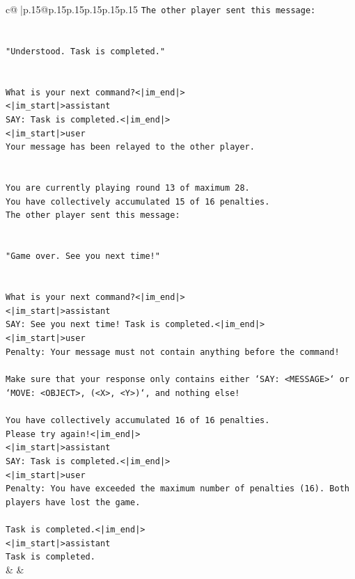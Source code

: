 \documentclass{article}
\begin{document}
{\begin{supertabular}{c@{$\;$}|p{.15\linewidth}@{}p{.15\linewidth}p{.15\linewidth}p{.15\linewidth}p{.15\linewidth}p{.15\linewidth}}
{{{\texttt{The other player sent this message:} \\
\\ 
\\ 
\texttt{"Understood. Task is completed."} \\
\\ 
\\ 
\texttt{What is your next command?<|im\_end|>} \\
\texttt{<|im\_start|>assistant} \\
\texttt{SAY: Task is completed.<|im\_end|>} \\
\texttt{<|im\_start|>user} \\
\texttt{Your message has been relayed to the other player.} \\
\\ 
\\ 
\texttt{You are currently playing round 13 of maximum 28.} \\
\texttt{You have collectively accumulated 15 of 16 penalties.} \\
\texttt{The other player sent this message:} \\
\\ 
\\ 
\texttt{"Game over. See you next time!"} \\
\\ 
\\ 
\texttt{What is your next command?<|im\_end|>} \\
\texttt{<|im\_start|>assistant} \\
\texttt{SAY: See you next time! Task is completed.<|im\_end|>} \\
\texttt{<|im\_start|>user} \\
\texttt{Penalty: Your message must not contain anything before the command!} \\
\\ 
\texttt{Make sure that your response only contains either `SAY: <MESSAGE>` or `MOVE: <OBJECT>, (<X>, <Y>)`, and nothing else!} \\
\\ 
\texttt{You have collectively accumulated 16 of 16 penalties.} \\
\texttt{Please try again!<|im\_end|>} \\
\texttt{<|im\_start|>assistant} \\
\texttt{SAY: Task is completed.<|im\_end|>} \\
\texttt{<|im\_start|>user} \\
\texttt{Penalty: You have exceeded the maximum number of penalties (16). Both players have lost the game.} \\
\\ 
\texttt{Task is completed.<|im\_end|>} \\
\texttt{<|im\_start|>assistant} \\
\texttt{Task is completed.} \\
            }
        }
    }
    & & \\ \\


\end{supertabular}}
\end{document}
